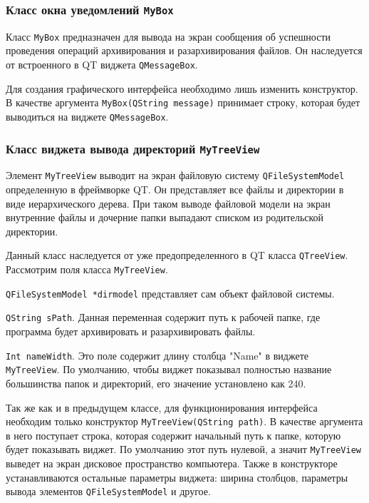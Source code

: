 \subsubsection{Класс окна уведомлений \texttt{MyBox}}

Класс \texttt{MyBox} предназначен для вывода на экран сообщения об успешности проведения операций архивирования и разархивирования файлов.
Он наследуется от встроенного в QT виджета \texttt{QMessageBox}\cite{qt_doc}.



Для создания графического интерфейса необходимо лишь изменить конструктор.
В качестве аргумента \texttt{MyBox(QString message)} принимает строку, которая будет выводиться на виджете \texttt{QMessageBox}.



\subsubsection{Класс виджета вывода директорий \texttt{MyTreeView}}

Элемент \texttt{MyTreeView} выводит на экран файловую систему \texttt{QFileSystemModel}\cite{qt_doc} определенную в фреймворке QT.
Он представляет все файлы и директории в виде иерархического дерева.
При таком выводе файловой модели на экран внутренние файлы и дочерние папки выпадают списком из родительской директории.



Данный класс наследуется от уже предопределенного в QT класса \texttt{QTreeView}\cite{qt_doc}.
Рассмотрим поля класса \texttt{MyTreeView}.



\texttt{QFileSystemModel *dirmodel} представляет сам объект файловой системы\cite{QT}.



\texttt{QString sPath}\cite{QT}. 
Данная переменная содержит путь к рабочей папке, где программа будет архивировать и разархивировать файлы.



\texttt{Int nameWidth}.
Это поле содержит длину столбца "Name" в виджете \texttt{MyTreeView}.
По умолчанию, чтобы виджет показывал полностью название большинства папок и директорий, его значение установлено как 240.



Так же как и в предыдущем классе, для функционирования интерфейса необходим только конструктор \texttt{MyTreeView(QString path)}.
В качестве аргумента в него поступает строка, которая содержит начальный путь к папке, которую будет показывать виджет.
По умолчанию этот путь нулевой, а значит \texttt{MyTreeView} выведет на экран дисковое пространство компьютера\cite{qt_doc}.
Также в конструкторе устанавливаются остальные параметры виджета: ширина столбцов, параметры вывода элементов \texttt{QFileSystemModel} и другое.



